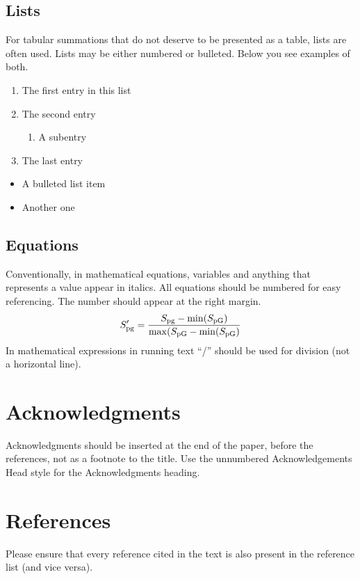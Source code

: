 \documentclass[times,twocolumn,final]{elsarticle}
\begin{document}
\subsection{Lists}

For tabular summations that do not deserve to be presented as
a table, lists are often used. Lists may be either numbered or
bulleted. Below you see examples of both.
\begin{enumerate}
\item The first entry in this list
\item The second entry
\begin{enumerate}
\item A subentry
\end{enumerate}
\item The last entry
\end{enumerate}
\begin{itemize}
\item A bulleted list item
\item Another one
\end{itemize}

\subsection{Equations}
Conventionally, in mathematical equations, variables and
anything that represents a value appear in italics.
All equations should be numbered for easy referencing. The number
should appear at the right margin.
\begin{equation}
S_{\rm pg}'=\frac{S_{\rm pg}-\min(S_{\rm pG})}
 {\max(S_{\rm pG}-\min(S_{\rm pG})}
\end{equation}
In mathematical expressions in running text ``/'' should be used for
division (not a horizontal line). 

\section*{Acknowledgments}
Acknowledgments should be inserted at the end of the paper, before the
references, not as a footnote to the title. Use the unnumbered
Acknowledgements Head style for the Acknowledgments heading.

\section*{References}

Please ensure that every reference cited in the text is also present in
the reference list (and vice versa).
\end{document}
